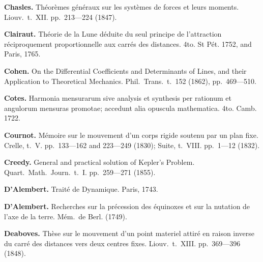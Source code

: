 \documentclass[11pt,a4paper]{book}
\begin{document}
\vspace{0.5em}

\noindent\textbf{Chasles.} Th\'{e}or\`{e}mes g\'{e}n\'{e}raux sur les syst\`{e}mes de forces et leurs moments. Liouv.~t.~XII. pp.~213---224 (1847).

\vspace{0.5em}

\noindent\textbf{Clairaut.} Th\'{e}orie de la Lune d\'{e}duite du seul principe de l'attraction r\'{e}ciproquement proportionnelle aux carr\'{e}s des distances. 4to. St P\'{e}t. 1752, and Paris, 1765.

\vspace{0.5em}

\noindent\textbf{Cohen.} On the Differential Coefficients and Determinants of Lines, and their Application to Theoretical Mechanics. Phil.~Trans.~t.~152 (1862), pp.~469---510.

\vspace{0.5em}

\noindent\textbf{Cotes.} Harmonia mensurarum sive analysis et synthesis per rationum et angulorum mensuras promotae; accedunt alia opuscula mathematica. 4to. Camb. 1722.

\vspace{0.5em}

\noindent\textbf{Cournot.} M\'{e}moire sur le mouvement d'un corps rigide soutenu par un plan fixe. Crelle, t.~V. pp.~133---162 and 223---249 (1830); Suite, t.~VIII. pp.~1---12 (1832).

\vspace{0.5em}

\noindent\textbf{Creedy.} General and practical solution of Kepler's Problem. Quart.~Math.~Journ.~t.~I. pp.~259---271 (1855).

\vspace{0.5em}

\noindent\textbf{D'Alembert.} Trait\'{e} de Dynamique. Paris, 1743.

\vspace{0.5em}

\noindent\textbf{D'Alembert.} Recherches sur la pr\'{e}cession des \'{e}quinoxes et sur la nutation de l'axe de la terre. M\'{e}m.~de Berl. (1749).

\vspace{0.5em}

\noindent\textbf{Deaboves.} Th\`{e}se sur le mouvement d'un point materiel attir\'{e} en raison inverse du carr\'{e} des distances vers deux centres fixes. Liouv.~t.~XIII. pp.~369---396 (1848).
\end{document}
